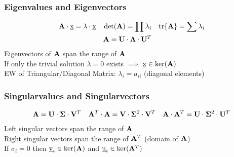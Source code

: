 \begin{mdframed}[style=eqbox]
\subsubsection{Eigenvalues and Eigenvectors}
\begin{align*}
  \mathbf{A} \cdot \underbar{x} = \lambda \cdot \underbar{x} && \det(\mathbf{A}) = \prod \lambda_i && \text{tr}\{\mathbf{A}\} = \sum \lambda_i\\
  &&\mathbf{A} = \mathbf{U} \cdot \mathbf{\Lambda} \cdot \mathbf{U}^{T}&&
\end{align*}
Eigenvectors of $\mathbf{A}$ span the range of $\mathbf{A}$\\
If only the trivial solution $\lambda = 0$ exists $\implies$ $\underbar{x} \in \text{ker}(\mathbf{A})$\\[0.25em]
EW of Triangular/Diagonal Matrix: $\lambda_i = a_{ii}$ (diagonal elements)

\subsubsection{Singularvalues and Singularvectors}
\begin{align*}
  \mathbf{A} = \mathbf{U} \cdot \mathbf{\Sigma} \cdot \mathbf{V}^{T} && \mathbf{A}^{T} \cdot \mathbf{A} = \mathbf{V} \cdot \mathbf{\Sigma}^{2} \cdot \mathbf{V}^{T} && \mathbf{A} \cdot \mathbf{A}^{T} = \mathbf{U} \cdot \mathbf{\Sigma}^{2} \cdot \mathbf{U}^{T}
\end{align*}
Left singular vectors span the range of $\mathbf{A}$\\
Right singular vectors span the range of $\mathbf{A}^{T}$ (domain of $\mathbf{A}$)\\
If $\sigma_i = 0$ then $\underbar{v}_i \in \text{ker}(\mathbf{A})$ and $\underbar{u}_i \in \text{ker}(\mathbf{A}^{T})$\\[0.25em]
\end{mdframed}

\newpage
